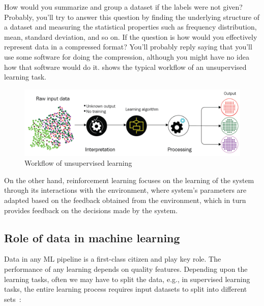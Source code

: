 \hspace*{3.5mm} How would you summarize and group a dataset if the labels were not given? Probably, you'll try to answer this question by finding the underlying structure of a dataset and measuring the statistical properties such as frequency distribution, mean, standard deviation, and so on. If the question is how would you effectively represent data in a compressed format? You'll probably reply saying that you'll use some software for doing the compression, although you might have no idea how that software would do it.  shows the typical workflow of an unsupervised learning task. 

\begin{figure}[h]
	\centering
	\includegraphics[width=\linewidth]{images/unsup.png}
	\caption{Workflow of unsupervised learning~\cite{karimScalaML2019}} 
	\label{fig:ml_pipeline_unsup}
\end{figure}

\hspace*{3.5mm} On the other hand, reinforcement learning focuses on the learning of the system through its interactions with the environment, where system's parameters are adapted based on the feedback obtained from the environment, which in turn provides feedback on the decisions made by the system. %


\subsection{Role of data in machine learning}
Data in any ML pipeline is a first-class citizen and play key role. The performance of any learning depends on quality features. Depending upon the learning tasks, often we may have to split the data, e.g., in supervised learning tasks, the entire learning process requires input datasets to split into different sets~\cite{karim2018java}:

